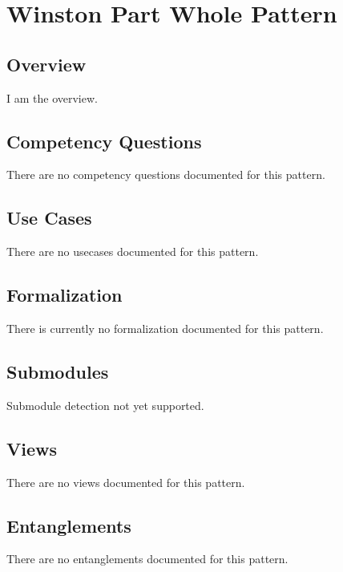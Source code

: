 
\section{Winston Part Whole Pattern}
\label{sec:winston-part-whole-pattern}
\subsection{Overview}
\label{ssec:overview}
I am the overview.

\subsection{Competency Questions}
\label{ssec:cqs}
There are no competency questions documented for this pattern.

\subsection{Use Cases}
\label{ssec:use-cases}
There are no usecases documented for this pattern.
\subsection{Formalization}
\label{ssec:formalization}
There is currently no formalization documented for this pattern.

\subsection{Submodules}
\label{ssec:submodules}
Submodule detection not yet supported.

\subsection{Views}
\label{ssec:views}
There are no views documented for this pattern.


\subsection{Entanglements}
\label{ssec:entanglements}
There are no entanglements documented for this pattern.

